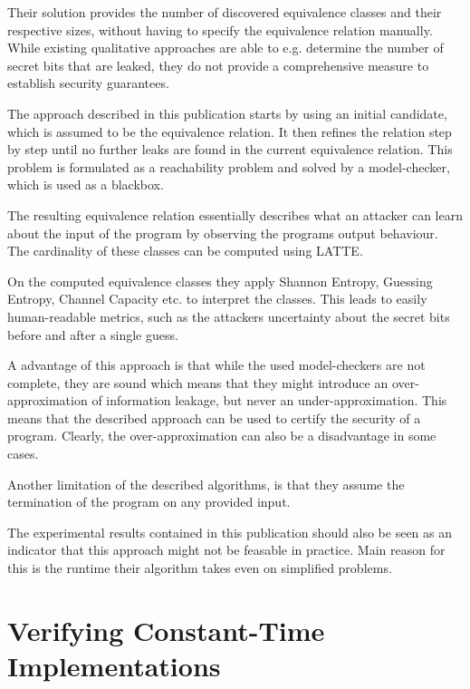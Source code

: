 \documentclass[a4paper,UKenglish]{lipics-v2018}
\begin{document}
Their solution provides the number of discovered equivalence classes and their respective sizes, without having to specify the equivalence relation manually. While existing qualitative approaches are able to e.g. determine the number of secret bits that are leaked, they do not provide a comprehensive measure to establish security guarantees.\cite{automatic_discovery_and_quantification}

The approach described in this publication starts by using an initial candidate, which is assumed to be the equivalence relation. It then refines the relation step by step until no further leaks are found in the current equivalence relation. This problem is formulated as a reachability problem and solved by a model-checker, which is used as a blackbox.\cite{automatic_discovery_and_quantification}

The resulting equivalence relation essentially describes what an attacker can learn about the input of the program by observing the programs output behaviour. The cardinality of these classes can be computed using LATTE.\cite{automatic_discovery_and_quantification}

On the computed equivalence classes they apply Shannon Entropy, Guessing Entropy, Channel Capacity etc. to interpret the classes. This leads to easily human-readable metrics, such as the attackers uncertainty about the secret bits before and after a single guess.\cite{automatic_discovery_and_quantification}

A advantage of this approach is that while the used model-checkers are not complete, they are sound which means that they might introduce an over-approximation of information leakage, but never an under-approximation. This means that the described approach can be used to certify the security of a program.\cite{automatic_discovery_and_quantification} Clearly, the over-approximation can also be a disadvantage in some cases. 

Another limitation of the described algorithms, is that they assume the termination of the program on any provided input.

The experimental results contained in this publication should also be seen as an indicator that this approach might not be feasable in practice. Main reason for this is the runtime their algorithm takes even on simplified problems.\cite{automatic_discovery_and_quantification}


\newpage
\section{Verifying Constant-Time Implementations}
\end{document}
